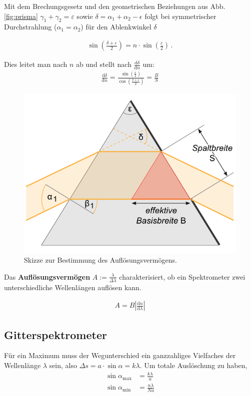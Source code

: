 \documentclass[12pt,a4paper,titlepage,headinclude,bibtotoc]{scrartcl}
\newcommand{\dif}{\ensuremath{\mathrm{d}}}
\begin{document}
Mit dem Brechungsgesetz  und den geometrischen Beziehungen aus Abb.\ref{fig:prisma} $\gamma_1+\gamma_2=\varepsilon$ sowie $\delta=\alpha_1+\alpha_2-\epsilon$ folgt bei symmetrischer Durchstrahlung ($\alpha_1=\alpha_2$) für den Ablenkwinkel $\delta$

\begin{align}
	\sin\left(\frac{\delta+\varepsilon}{2}\right)=n\cdot\sin\left(\frac{\varepsilon}{2}\right)\,.
\end{align}

Dies leitet man nach $n$ ab und stellt nach $\frac{\dif \delta}{\dif n}$ um:
\begin{align}
	\frac{\dif \delta}{\dif n}=\frac{\sin\left(\frac{\varepsilon}{2}\right)}{\cos\left(\frac{\delta+\varepsilon}{2}\right)}=\frac{B}{S}
\end{align}

\begin{figure}[!h]
	\centering
	\includegraphics[scale=0.6]{Prisma2.png}
	\caption{Skizze zur Bestimmung des Auflösungsvermögens. \cite[Datum: 28.12.2014]{LP19}}
	\label{fig:prisma2}
\end{figure}

Das \textbf{Auflösungsvermögen} $A:=\frac{\lambda}{\Delta\lambda}$ charakterisiert, ob ein Spektrometer zwei unterschiedliche Wellenlängen auflösen kann.

\begin{align}
	A=B\left|\frac{\dif n}{\dif \lambda}\right|
\end{align}

\subsection{Gitterspektrometer}
Für ein Maximum muss der Wegunterschied ein ganzzahliges Vielfaches der Wellenlänge $\lambda$ sein, also $\Delta s=a \cdot \sin \alpha=k \lambda$.
Um totale Auslöschung zu haben, 
\begin{align}
	\sin\alpha_\text{max}&=\frac{k\lambda}{a}\\
	\sin\alpha_\text{min}&=\frac{n\lambda}{Na}
\end{align}
\end{document}
